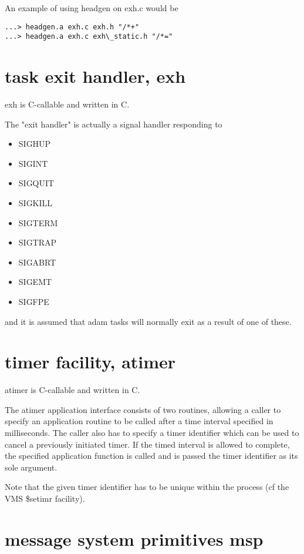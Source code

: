 An example of using headgen on exh.c would be

\begin{verbatim}
...> headgen.a exh.c exh.h "/*+"
...> headgen.a exh.c exh\_static.h "/*="
\end{verbatim}

\section {task exit handler, exh}

exh is C-callable and written in C.

The "exit handler" is actually a signal handler responding to

\begin{itemize}
\item SIGHUP
\item SIGINT
\item SIGQUIT
\item SIGKILL
\item SIGTERM
\item SIGTRAP
\item SIGABRT
\item SIGEMT
\item SIGFPE
\end{itemize}

and it is assumed that adam tasks will normally exit as a result of one of
these.

\section {timer facility, atimer}

atimer is C-callable and written in C.

The atimer application interface consists of two routines, allowing a
caller to specify an application routine to be called after a time
interval specified in milliseconds. The caller also has to specify a
timer identifier which can be used to cancel a previously initiated
timer. If the timed interval is allowed to complete, the specified
application function is called and is passed the timer identifier as its
sole argument.

Note that the given timer identifier has to be unique within the process
(cf the VMS \$setimr facility).


\section {message system primitives msp}


